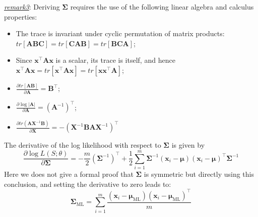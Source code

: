 \documentclass{article}
\begin{document}
\begin{itemize}
	\begin{footnotesize}
	\textit{\underline{remark3}}: Deriving $\bm{\Sigma}$ requires the use of the following linear algebra and calculus properties:	
	\begin{itemize}
	\item The trace is invariant under cyclic permutation of matrix products: $tr[\bm{A}\bm{B}\bm{C}]=tr[\bm{C}\bm{A}\bm{B}]=tr[\bm{B}\bm{C}\bm{A}]$;
	\item Since $\bm{x}^\top \bm{A} \bm{x}$ is a scalar, its trace is itself, and hence $\bm{x}^\top \bm{A} \bm{x} = tr[\bm{x}^\top \bm{A} \bm{x}] = tr[\bm{x} \bm{x}^\top \bm{A}]$;
	\item $\frac{\partial tr[\bm{A} \bm{B}]}{\partial \bm{A}} = \bm{B}^\top$;
	\item $\frac{\partial \log |\bm{A}|}{\partial \bm{A}} = (\bm{A}^{-1})^\top$;
	\item $\frac{\partial tr(\bm{A}\bm{X}^{-1}\bm{B})}{\partial \bm{X}} = -(\bm{X}^{-1} \bm{BA}\bm{X}^{-1})^\top$
	\end{itemize}
	\end{footnotesize}
	The derivative of the log likelihood with respect to $\bm{\Sigma}$ is given by
	\begin{equation*}
	\frac{\partial \log L(S;\theta)}{\partial \bm{\Sigma}} = -\frac{m}{2} (\bm{\Sigma}^{-1})^\top + \frac{1}{2} \sum_{i=1}^m  \bm{\Sigma}^{-1} (\bm{x}_i - \bm{\mu})(\bm{x}_i - \bm{\mu})^\top \bm{\Sigma}^{-1}
	\end{equation*}
Here we does not give a formal proof that $\bm{\Sigma}$ is symmetric but directly using this conclusion, and setting the derivative to zero leads to:
	\begin{equation}
	\bm{\Sigma}_{\mathrm{ML}} = \sum_{i=1}^m \frac{(\bm{x}_i - \bm{\mu}_{\mathrm{ML}})(\bm{x}_i - \bm{\mu}_{\mathrm{ML}})^\top}{m}
	\end{equation}
	

\end{itemize}
\end{document}
